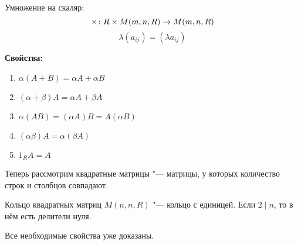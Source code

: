 \begin{Def}
Умножение на скаляр:
$$\times\colon R \times M(m, n, R) \rightarrow M(m, n, R)$$
$$\lambda (a_{ij}) = (\lambda a_{ij})$$
\end{Def}

{\bf Свойства:}
\begin{enumerate}
\item $\alpha(A + B) = \alpha A + \alpha B$
\item $(\alpha + \beta)A = \alpha A + \beta A$
\item $\alpha(AB) = (\alpha A) B = A(\alpha B)$
\item $(\alpha \beta)A = \alpha(\beta A)$
\item $1_R A = A$
\end{enumerate}

Теперь рассмотрим квадратные матрицы "--- матрицы, у которых количество строк и столбцов совпадают.

\begin{theorem}{Кольцо квадратных матриц}
$M(n, n, R)$ "--- кольцо с единицей. Если $2 \mid n$, то в нём есть делители нуля.
\end{theorem}
Все необходимые свойства уже доказаны.